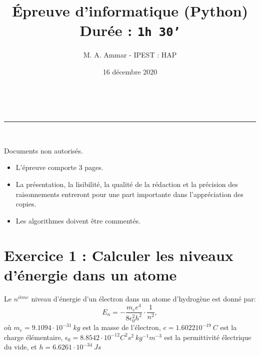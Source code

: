 \documentclass[a4paper,11pt]{article}
\author{M. A. Ammar - IPEST : HAP}
\date{16 décembre 2020}
\makeatletter
\newcommand{\linia}{\rule{\linewidth}{0.5pt}}
\theoremstyle{mytheor}
\renewcommand{\maketitle}{
\begin{center}
\vspace{2ex}
{\huge \textsc{\@title}}
\vspace{1ex}
\\
\linia\\
\@author \hfill \@date
\vspace{4ex}
\end{center}
}
\makeatother
\begin{document}
	
\title{Épreuve d'informatique (Python)  \\ Durée : \texttt{1h 30'}}

\maketitle
\begin{bclogo}[logo=\bcattention, couleurBarre=red, noborder=true, couleur=red!10]{Documents non autorisés.}
\begin{itemize}
\item L'épreuve comporte 3 pages.
\item La présentation, la lisibilité, la qualité de la rédaction et la précision des raisonnements entreront pour une part importante dans l'appréciation des copies.
\item  Les algorithmes doivent être commentés.
\end{itemize}

\end{bclogo}
\section*{Exercice 1 : Calculer les niveaux d'énergie dans un atome}
Le $n^{ième}$ niveau d'énergie d'un électron dans un atome d'hydrogène est donné par:
\begin{equation}
E_n = -\frac{m_e e^4}{8\epsilon_0^2h^2}\cdot\frac{1}{n^2} ,
\end{equation}
où $m_e = 9.1094⋅10^{-31} \ kg$ est la masse de l'électron, $e = 1.602210^{−19} \ C$ est la charge élémentaire, $\epsilon_0 = 8.8542 \cdot 10^{-12} C^2 s^2 \ kg^{-1}m^{-3}$ est la permittivité électrique du vide, et $h=6.6261 \cdot 10^{−34} \ Js$
\end{document}
